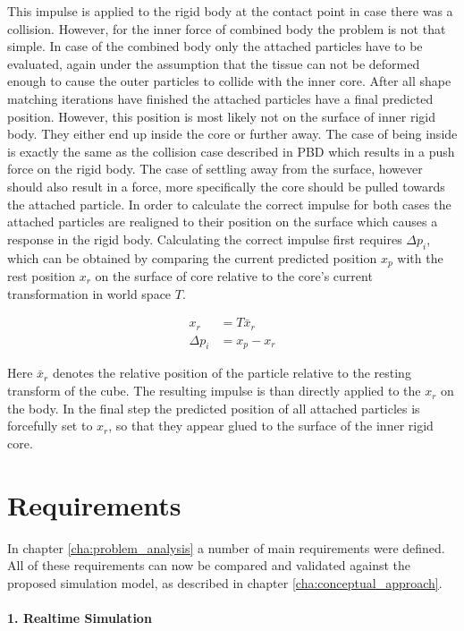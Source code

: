 This impulse is applied to the rigid body at the contact point in case there was a collision. However, for  the inner force of combined body the problem is not that simple. In case of the combined body only the attached particles have to be evaluated, again under the assumption that the tissue can not be deformed enough to cause the outer particles to collide with the inner core. After all shape matching iterations have finished the attached particles have a final predicted position. However, this position is most likely not on the surface of inner rigid body. They either end up inside the core or further away. The case of being inside is exactly the same as the collision case described in PBD which results in a push force on the rigid body. The case of settling away from the surface, however should also result in a force, more specifically the core should be pulled towards the attached particle. In order to calculate the correct impulse for both cases the attached particles are realigned to their position on the surface which causes a response in the rigid body. Calculating the correct impulse first requires $\Delta p_i$, which can be obtained by comparing the current predicted position $x_p$ with the rest position $x_r$ on the surface of core relative to the core's current transformation in world space $T$.

\begin{align}
x_r &= T\bar{x}_r \\
\Delta p_i &= x_p - x_r
\end{align}

Here $\bar{x}_r$ denotes the relative position of the particle relative to the resting transform of the cube. The resulting impulse is than directly applied to the $x_r$ on the body. In the final step the predicted position of all attached particles is forcefully set to $x_r$, so that they appear glued to the surface of the inner rigid core.

\section{Requirements}

In chapter \ref{cha:problem_analysis} a number of main requirements were defined. All of these requirements can now be compared and validated against the proposed simulation model, as described in chapter \ref{cha:conceptual_approach}.

\paragraph{1. Realtime Simulation}

